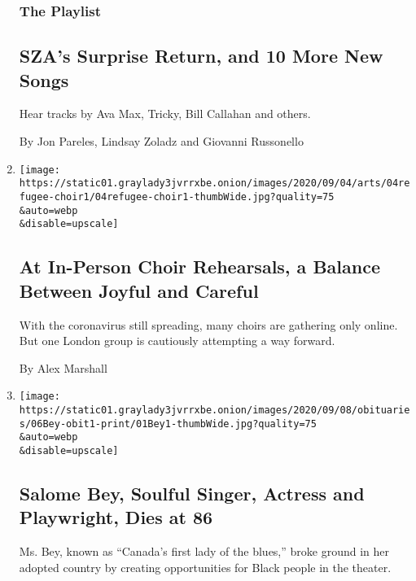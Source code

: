 \begin{enumerate}
  \hypertarget{the-playlist}{%
  \subsubsection{The Playlist}\label{the-playlist}}

  \hypertarget{szas-surprise-return-and-10-more-new-songs}{%
  \subsection{SZA's Surprise Return, and 10 More New
  Songs}\label{szas-surprise-return-and-10-more-new-songs}}

  Hear tracks by Ava Max, Tricky, Bill Callahan and others.

  By Jon Pareles, Lindsay Zoladz and Giovanni Russonello
\item
  \href{/2020/09/04/arts/music/choirs-coronavirus.html}{}

  \texttt{[image: https://static01.graylady3jvrrxbe.onion/images/2020/09/04/arts/04refugee-choir1/04refugee-choir1-thumbWide.jpg?quality=75\\\&auto=webp\\\&disable=upscale]}

  \hypertarget{at-in-person-choir-rehearsals-a-balance-between-joyful-and-careful}{%
  \subsection{At In-Person Choir Rehearsals, a Balance Between Joyful
  and
  Careful}\label{at-in-person-choir-rehearsals-a-balance-between-joyful-and-careful}}

  With the coronavirus still spreading, many choirs are gathering only
  online. But one London group is cautiously attempting a way forward.

  By Alex Marshall
\item
  \href{/2020/09/04/arts/salome-bey-dead.html}{}

  \texttt{[image: https://static01.graylady3jvrrxbe.onion/images/2020/09/08/obituaries/06Bey-obit1-print/01Bey1-thumbWide.jpg?quality=75\\\&auto=webp\\\&disable=upscale]}

  \hypertarget{salome-bey-soulful-singer-actress-and-playwright-dies-at-86}{%
  \subsection{Salome Bey, Soulful Singer, Actress and Playwright, Dies
  at
  86}\label{salome-bey-soulful-singer-actress-and-playwright-dies-at-86}}

  Ms. Bey, known as ``Canada's first lady of the blues,'' broke ground
  in her adopted country by creating opportunities for Black people in
  the theater.


\end{enumerate}

